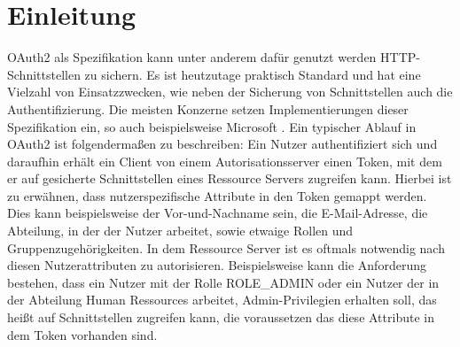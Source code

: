 \chapter{Einleitung}
\label{ch:intro}
OAuth2 als Spezifikation kann unter anderem dafür genutzt werden \ac{HTTP}-Schnittstellen zu sichern. Es ist heutzutage praktisch Standard und hat eine Vielzahl von Einsatzzwecken, wie neben der Sicherung von Schnittstellen auch die Authentifizierung. Die meisten Konzerne setzen Implementierungen dieser Spezifikation ein, so auch beispielsweise Microsoft \citep{microsoftoauth2:2021:07}. Ein typischer Ablauf in OAuth2 ist folgendermaßen zu beschreiben: Ein Nutzer authentifiziert sich und daraufhin erhält ein Client von einem Autorisationsserver einen Token, mit dem er auf gesicherte Schnittstellen eines Ressource Servers zugreifen kann. Hierbei ist zu erwähnen, dass nutzerspezifische Attribute in den Token gemappt werden. Dies kann beispielsweise der Vor-und-Nachname sein, die E-Mail-Adresse, die Abteilung, in der der Nutzer arbeitet, sowie etwaige Rollen und Gruppenzugehörigkeiten. In dem Ressource Server ist es oftmals notwendig nach diesen Nutzerattributen zu autorisieren. Beispielsweise kann die Anforderung bestehen, dass ein Nutzer mit der Rolle ROLE\_ADMIN oder ein Nutzer der in der Abteilung Human Ressources arbeitet, Admin-Privilegien erhalten soll, das heißt auf Schnittstellen zugreifen kann, die voraussetzen das diese Attribute in dem Token vorhanden sind.\smallskip

